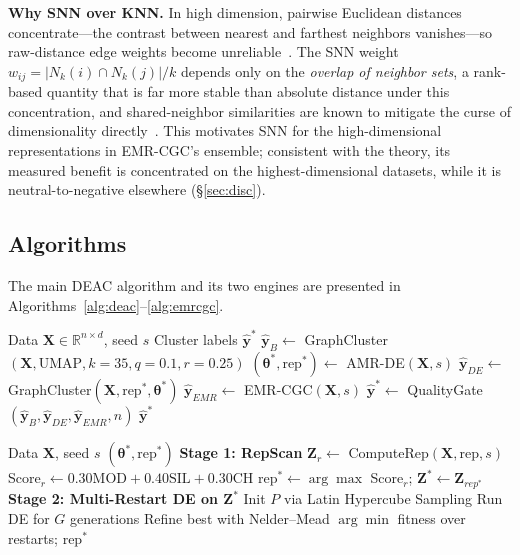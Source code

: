 \documentclass[journal]{IEEEtran}
\begin{document}


\textbf{Why SNN over KNN.} In high dimension, pairwise Euclidean distances concentrate---the contrast between nearest and farthest neighbors vanishes---so raw-distance edge weights become unreliable~\cite{beyer1999nearest}. The SNN weight $w_{ij}=|N_k(i)\cap N_k(j)|/k$ depends only on the \emph{overlap of neighbor sets}, a rank-based quantity that is far more stable than absolute distance under this concentration, and shared-neighbor similarities are known to mitigate the curse of dimensionality directly~\cite{houle2010shared}. This motivates SNN for the high-dimensional representations in EMR-CGC's ensemble; consistent with the theory, its measured benefit is concentrated on the highest-dimensional datasets, while it is neutral-to-negative elsewhere (\S\ref{sec:disc}).

\subsection{Algorithms}

The main DEAC algorithm and its two engines are presented in Algorithms~\ref{alg:deac}--\ref{alg:emrcgc}.

\begin{algorithm}[!t]
\caption{DEAC --- Main Algorithm}
\label{alg:deac}
\begin{algorithmic}[1]
\REQUIRE Data $\mathbf{X} \in \mathbb{R}^{n \times d}$, seed $s$
\ENSURE Cluster labels $\hat{\mathbf{y}}^*$
\STATE $\hat{\mathbf{y}}_B \leftarrow$ GraphCluster$(\mathbf{X},\text{UMAP}, k{=}35, q{=}0.1, r{=}0.25)$
\STATE $(\boldsymbol{\theta}^*, \text{rep}^*) \leftarrow$ AMR-DE$(\mathbf{X}, s)$ 
\STATE $\hat{\mathbf{y}}_{DE} \leftarrow$ GraphCluster$(\mathbf{X}, \text{rep}^*, \boldsymbol{\theta}^*)$
\STATE $\hat{\mathbf{y}}_{EMR} \leftarrow$ EMR-CGC$(\mathbf{X}, s)$ 
\STATE $\hat{\mathbf{y}}^* \leftarrow$ QualityGate$(\hat{\mathbf{y}}_B, \hat{\mathbf{y}}_{DE}, \hat{\mathbf{y}}_{EMR}, n)$
\RETURN $\hat{\mathbf{y}}^*$
\end{algorithmic}
\end{algorithm}

\begin{algorithm}[!t]
\caption{AMR-DE --- Engine 1}
\label{alg:amrde}
\begin{algorithmic}[1]
\REQUIRE Data $\mathbf{X}$, seed $s$
\ENSURE $(\boldsymbol{\theta}^*, \text{rep}^*)$
\STATE \textbf{Stage 1: RepScan}
  \STATE $\mathbf{Z}_r \leftarrow$ ComputeRep$(\mathbf{X}, \text{rep}, s)$
  \STATE Score$_r \leftarrow 0.30\text{MOD}+0.40\text{SIL}+0.30\text{CH}$
\ENDFOR
\STATE rep$^* \leftarrow \arg\max$ Score$_r$; $\mathbf{Z}^* \leftarrow \mathbf{Z}_{rep^*}$
\STATE \textbf{Stage 2: Multi-Restart DE on $\mathbf{Z}^*$}
  \STATE Init $P$ via Latin Hypercube Sampling
  \STATE Run DE for $G$ generations
  \STATE Refine best with Nelder--Mead
\ENDFOR
\RETURN $\arg\min$ fitness over restarts; rep$^*$
\end{algorithmic}
\end{algorithm}
\end{document}
